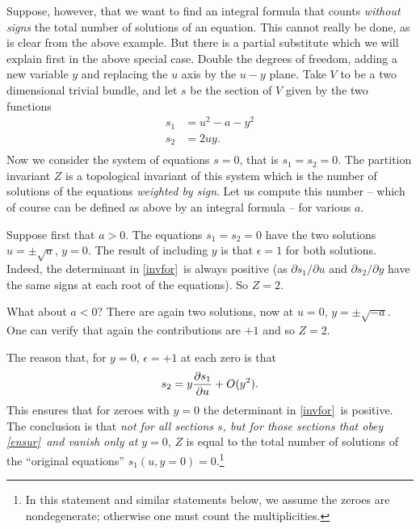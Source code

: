 \documentclass[12pt]{article}
\numberwithin{equation}{section}
\begin{document}
Suppose, however, that we want to find an integral formula
that counts {\it without signs}
the total number of solutions of an equation.
This cannot really be done, as is clear
from the above example.  But there is a partial substitute which we will
explain first in the above special case.
Double the degrees of freedom, adding a new variable $y$
and replacing the $u$ axis by the $u-y$ plane.
Take $V$ to be a two dimensional trivial bundle, and let $s$ be the section
of $V$ given by the two functions
\begin{equation}
  \label{mippol}
  \begin{aligned} s_1 & = u^2-a-y^2  \\ s_2 & = 2uy. \\
  \end{aligned}
\end{equation}
Now we consider the system of equations $s=0$, that is $s_1=s_2=0$.
The partition invariant $Z$ is a topological invariant
of this system which is the number
of solutions of the equations
{\it weighted by sign}.  Let us compute this number -- which
of course can be defined as above by an integral formula --
for various $a$.

Suppose first that $a>0$.  The equations $s_1=s_2=0$ have the
two solutions $u=\pm \sqrt a$, $y=0$.
The result of including $y$ is that $\epsilon=1$ for both solutions.
Indeed, the determinant in \eqref{invfor}\ is always positive
(as $\partial s_1/\partial u$ and $\partial s_2/\partial y$ have
the same signs at each root of the equations).  So $Z=2$.

What about $a<0$?  There are again two solutions, now at $u=0$,
$y=\pm \sqrt{- a}$.  One can verify that again the contributions are $+1$
and so  $Z=2$.

The reason that, for $y=0$, $\epsilon=+1$ at each zero
is that
\begin{equation}
  \label{ensur}
  s_2=y{\partial s_1\over \partial u}+O(y^2).
\end{equation}
This ensures that for zeroes with
$y=0$ the determinant in \eqref{invfor}\ is positive.
The conclusion is that {\it not for all sections $s$, but for those
sections that obey \eqref{ensur}\ and vanish only at $y=0$}, $Z$ is
equal to the total number
of solutions of the ``original equations''
$s_1(u,y=0)=0$.\footnote{In  this statement  and similar statements
  below, we  assume the zeroes are nondegenerate; otherwise one must
count the multiplicities.}

\bigskip
{}
\end{document}
